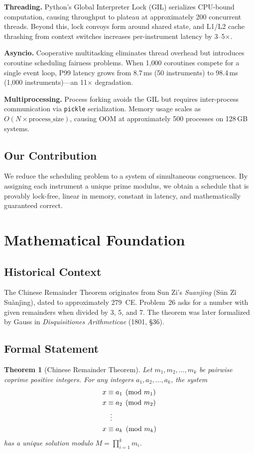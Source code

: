 \documentclass[11pt,a4paper]{article}
\newtheorem{theorem}{Theorem}
\begin{document}
\textbf{Threading.} Python's Global Interpreter Lock (GIL) serializes CPU-bound computation, causing throughput to plateau at approximately 200 concurrent threads. Beyond this, lock convoys form around shared state, and L1/L2 cache thrashing from context switches increases per-instrument latency by 3--5$\times$.

\textbf{Asyncio.} Cooperative multitasking eliminates thread overhead but introduces coroutine scheduling fairness problems. When 1{,}000 coroutines compete for a single event loop, P99 latency grows from 8.7\,ms (50 instruments) to 98.4\,ms (1{,}000 instruments)---an 11$\times$ degradation.

\textbf{Multiprocessing.} Process forking avoids the GIL but requires inter-process communication via \texttt{pickle} serialization. Memory usage scales as $O(N \times \text{process\_size})$, causing OOM at approximately 500 processes on 128\,GB systems.

\subsection{Our Contribution}

We reduce the scheduling problem to a system of simultaneous congruences. By assigning each instrument a unique prime modulus, we obtain a schedule that is provably lock-free, linear in memory, constant in latency, and mathematically guaranteed correct.

\section{Mathematical Foundation}

\subsection{Historical Context}

The Chinese Remainder Theorem originates from Sun Zi's \emph{Suanjing} (S\={u}n Z\v{i} Su\`{a}nj\={\i}ng), dated to approximately 279~CE. Problem~26 asks for a number with given remainders when divided by 3, 5, and 7. The theorem was later formalized by Gauss in \emph{Disquisitiones Arithmeticae} (1801, \S36).

\subsection{Formal Statement}

\begin{theorem}[Chinese Remainder Theorem]
Let $m_1, m_2, \ldots, m_k$ be pairwise coprime positive integers. For any integers $a_1, a_2, \ldots, a_k$, the system
\begin{align}
x &\equiv a_1 \pmod{m_1} \notag \\
x &\equiv a_2 \pmod{m_2} \notag \\
  &\;\;\vdots \notag \\
x &\equiv a_k \pmod{m_k} \notag
\end{align}
has a unique solution modulo $M = \prod_{i=1}^{k} m_i$.
\end{theorem}
\end{document}
